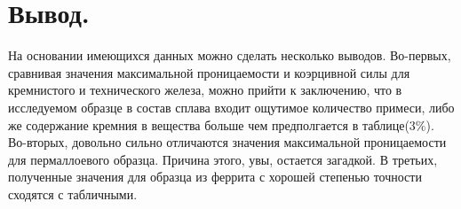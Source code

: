 \documentclass[a4paper]{article}%
\begin{document}
\section*{Вывод.}
На основании имеющихся данных можно сделать несколько выводов. Во-первых, сравнивая значения  максимальной проницаемости и коэрцивной силы для кремнистого и технического железа, можно прийти к заключению, что в исследуемом образце в состав сплава входит ощутимое количество примеси, либо же содержание кремния в вещества больше чем предполгается в таблице(3$\%$). Во-вторых, довольно сильно отличаются значения максимальной проницаемости для пермаллоевого образца. Причина этого, увы, остается загадкой. В третьих, полученные значения для образца из феррита с хорошей степенью точности сходятся с табличными.	
\end{document}
